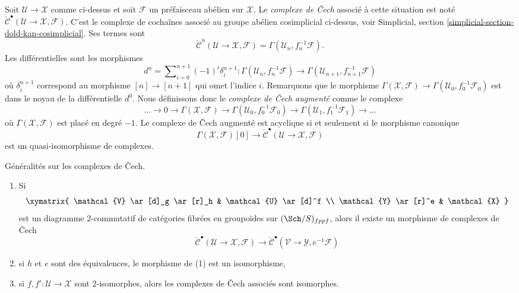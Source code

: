 \medskip\noindent
Soit $\mathcal{U} \to \mathcal{X}$ comme ci-dessus et soit $\mathcal{F}$
un préfaisceau abélien sur $\mathcal{X}$.
Le {\it complexe de {\v C}ech} associé à cette situation est noté
$\check{\mathcal{C}}^\bullet(\mathcal{U} \to \mathcal{X}, \mathcal{F})$.
C'est le complexe de cochaînes associé au groupe abélien cosimplicial
ci-dessus, voir
Simplicial, section \ref{simplicial-section-dold-kan-cosimplicial}.
Ses termes sont
$$
\check{\mathcal{C}}^n(\mathcal{U} \to \mathcal{X}, \mathcal{F})
= \Gamma(\mathcal{U}_n, f_n^{-1}\mathcal{F}).
$$
Les différentielles sont les morphismes
$$
d^n = \sum\nolimits_{i = 0}^{n + 1} (-1)^i \delta^{n + 1}_i :
\Gamma(\mathcal{U}_n, f_n^{-1}\mathcal{F})
\longrightarrow
\Gamma(\mathcal{U}_{n + 1}, f_{n + 1}^{-1}\mathcal{F})
$$
où $\delta^{n + 1}_i$ correspond au morphisme
$[n] \to [n + 1]$ qui omet l'indice $i$. Remarquons que le morphisme
$\Gamma(\mathcal{X}, \mathcal{F}) \to
\Gamma(\mathcal{U}_0, f_0^{-1}\mathcal{F}_0)$
est dans le noyau de la différentielle $d^0$. Nous définissons donc
le {\it complexe de {\v C}ech augmenté} comme le complexe
$$
\ldots \to 0 \to
\Gamma(\mathcal{X}, \mathcal{F}) \to
\Gamma(\mathcal{U}_0, f_0^{-1}\mathcal{F}_0) \to
\Gamma(\mathcal{U}_1, f_1^{-1}\mathcal{F}_1) \to \ldots
$$
où $\Gamma(\mathcal{X}, \mathcal{F})$ est placé en degré $-1$.
Le complexe de {\v C}ech augmenté est acyclique si et seulement si le morphisme canonique
$$
\Gamma(\mathcal{X}, \mathcal{F})[0]
\longrightarrow
\check{\mathcal{C}}^\bullet(\mathcal{U} \to \mathcal{X}, \mathcal{F})
$$
est un quasi-isomorphisme de complexes.

\begin{lemma}
\label{lemma-generalities}
Généralités sur les complexes de {\v C}ech.
\begin{enumerate}
\item Si
$$
\xymatrix{
\mathcal{V} \ar[d]_g \ar[r]_h & \mathcal{U} \ar[d]^f \\
\mathcal{Y} \ar[r]^e & \mathcal{X}
}
$$
est un diagramme $2$-commutatif de catégories fibrées en groupoïdes sur
$(\Sch/S)_{fppf}$, alors il existe un morphisme de complexes de {\v C}ech
$$
\check{\mathcal{C}}^\bullet(\mathcal{U} \to \mathcal{X}, \mathcal{F})
\longrightarrow
\check{\mathcal{C}}^\bullet(\mathcal{V} \to \mathcal{Y}, e^{-1}\mathcal{F})
$$
\item si $h$ et $e$ sont des équivalences, le morphisme de (1) est un isomorphisme,
\item si $f, f' : \mathcal{U} \to \mathcal{X}$ sont $2$-isomorphes, alors
les complexes de {\v C}ech associés sont isomorphes.
\end{enumerate}
\end{lemma}

